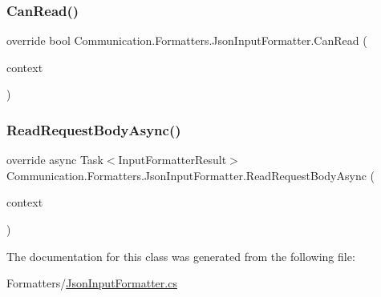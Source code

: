 \subsubsection{\texorpdfstring{Can\+Read()}{CanRead()}}
{\footnotesize\ttfamily override bool Communication.\+Formatters.\+Json\+Input\+Formatter.\+Can\+Read (\begin{DoxyParamCaption}\item[{Input\+Formatter\+Context}]{context }\end{DoxyParamCaption})}

\mbox{\label{class_communication_1_1_formatters_1_1_json_input_formatter_a419451e6045e0c5ebca0d71496437c21}} 
\subsubsection{\texorpdfstring{Read\+Request\+Body\+Async()}{ReadRequestBodyAsync()}}
{\footnotesize\ttfamily override async Task$<$Input\+Formatter\+Result$>$ Communication.\+Formatters.\+Json\+Input\+Formatter.\+Read\+Request\+Body\+Async (\begin{DoxyParamCaption}\item[{Input\+Formatter\+Context}]{context }\end{DoxyParamCaption})}



The documentation for this class was generated from the following file\+:\begin{DoxyCompactItemize}
\item 
Formatters/\mbox{\hyperlink{_json_input_formatter_8cs}{Json\+Input\+Formatter.\+cs}}\end{DoxyCompactItemize}

